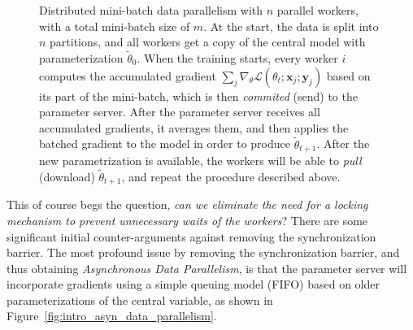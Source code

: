 \begin{figure}[H]
  \caption{Distributed mini-batch data parallelism with $n$ parallel workers, with a total mini-batch size of $m$. At the start, the data is split into $n$ partitions, and all workers get a copy of the central model with parameterization $\tilde{\theta}_0$. When the training starts, every worker $i$ computes the accumulated gradient $\sum_j \nabla_\theta \mathcal{L}(\theta_t;\textbf{x}_j;\textbf{y}_j)$ based on its part of the mini-batch, which is then \emph{commited} (send) to the parameter server. After the parameter server receives all accumulated gradients, it averages them, and then applies the batched gradient to the model in order to produce $\tilde{\theta}_{t+1}$. After the new parametrization is available, the workers will be able to \emph{pull} (download) $\tilde{\theta}_{t+1}$, and repeat the procedure described above.}
  \label{fig:distributed_mini_batch_parallelism}
\end{figure}

This of course begs the question, \emph{can we eliminate the need for a locking mechanism to prevent unnecessary waits of the workers}? There are some significant initial counter-arguments against removing the synchronization barrier. The most profound issue by removing the synchronization barrier, and thus obtaining \emph{Asynchronous Data Parallelism}, is that the parameter server will incorporate gradients using a simple queuing model (FIFO) based on older parameterizations of the central variable, as shown in Figure~\ref{fig:intro_asyn_data_parallelism}.

